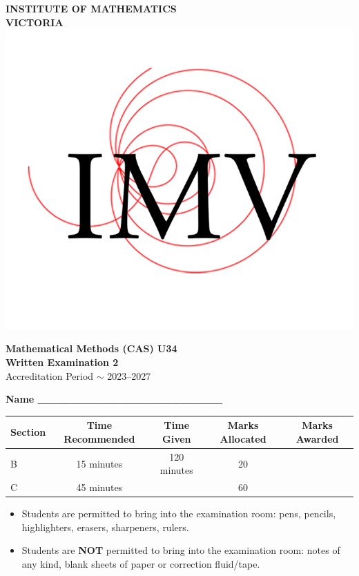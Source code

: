 \documentclass[a4paper,12pt]{article}
\begin{document}
\begin{center}
    \vspace{0.2cm}
    
    \Huge \textbf{INSTITUTE OF MATHEMATICS \\ VICTORIA} \\
    \vspace{0.2cm}
    \includegraphics[width=0.2\linewidth]{IMV yt.png}
    \vspace{0.2cm}
    
    \LARGE \textbf{Mathematical Methods (CAS) U34} \\
    \vspace{0.2cm}
    \LARGE \textbf{Written Examination 2} \\
    \vspace{0.2cm}
    \Large Accreditation Period $\sim$ 2023--2027 \\
    \vspace{1cm}
    
    \normalsize \textbf{Name \_\_\_\_\_\_\_\_\_\_\_\_\_\_\_\_\_\_\_\_\_\_} \\
    \vspace{1cm}
    
    \begin{tabular}{|l|c|c|c|c|}
        \hline
        \textbf{Section} & \textbf{Time Recommended} & \textbf{Time Given} & \textbf{Marks Allocated} & \textbf{Marks Awarded} \\
        \hline
        B & 15 minutes & 120 minutes & 20 & \\
        \hline
        C & 45 minutes & & 60 & \\
        \hline
    \end{tabular}
    
    \vspace{1cm}
    
    \begin{minipage}{0.9\textwidth}
    \begin{itemize}
        \item Students are permitted to bring into the examination room: pens, pencils, highlighters, erasers, sharpeners, rulers.
        \item Students are \textbf{NOT} permitted to bring into the examination room: notes of any kind, blank sheets of paper or correction fluid/tape.
    \end{itemize}
    \end{minipage}
    

\end{center}
\end{document}
